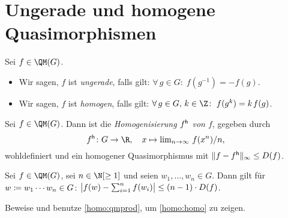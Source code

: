 \section{Ungerade und homogene Quasimorphismen}
\begin{thDef}
    Sei $f\in\QM(G)$.
    \begin{itemize}
        \item
            Wir sagen, $f$ ist \emph{ungerade}, falls gilt:
            $\forall\,g\in G\colon\; f(g^{-1}) = -f(g)$.
            
        \item
            Wir sagen, $f$ ist \emph{homogen}, falls gilt:
            $\forall\,g\in G,\,k\in\Z\colon\;
                f(g^k) = k \mkern2mu f(g)$.
    \end{itemize}
\end{thDef}

\begin{thProposition}[Homogenisierung]
    \label{homo:homo}%
    Sei $f\in\QM(G)$. Dann ist die \emph{Homogenisierung $f\homo$ von $f$},
    gegeben durch
    \[ f\homo \colon G \to \R, \quad
        x\mapsto \lim\nolimits_{n\to\infty}\, f(x^n)/n
    , \]
    wohldefiniert und ein homogener Quasimorphismus mit
    $\norm{f-f\homo}_\supr \leq D(f)$.
\end{thProposition}

\begin{thLemma} \label{homo:qmprod}
    Sei $f\in\QM(G)$, sei $n\in\N[\geq1]$ und seien
    $w_1,\dots,w_n\in G$. Dann gilt für $w\defeq w_1\cdots w_n\in G$:
    \quad
    $\abs[\big]{ f(w) - \sum\nolimits_{i=1}^n f(w_i) } \leq (n-1)\cdot D(f)$.
\end{thLemma}

\begin{thAufgabe}
    Beweise und benutze \cref{homo:qmprod}, um \cref{homo:homo} zu zeigen.
\end{thAufgabe}
